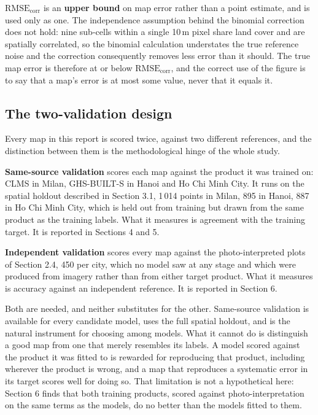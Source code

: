 \documentclass[11pt,a4paper]{article}
\begin{document}
$\mathrm{RMSE}_{\mathrm{corr}}$ is an \textbf{upper bound} on map error rather than a point estimate, and
is used only as one. The independence assumption behind the binomial correction
does not hold: nine sub-cells within a single 10\,m pixel share land cover and
are spatially correlated, so the binomial calculation understates the true
reference noise and the correction consequently removes less error than it
should. The true map error is therefore at or below $\mathrm{RMSE}_{\mathrm{corr}}$, and the correct
use of the figure is to say that a map's error is at most some value, never that
it equals it.

\subsection{The two-validation design}

Every map in this report is scored twice, against two different references, and
the distinction between them is the methodological hinge of the whole study.

\textbf{Same-source validation} scores each map against the product it was trained
on: CLMS in Milan, GHS-BUILT-S in Hanoi and Ho Chi Minh City. It runs on the
spatial holdout described in Section 3.1, 1\,014 points in Milan, 895 in Hanoi,
887 in Ho Chi Minh City, which is held out from training but drawn from the
same product as the training labels. What it measures is agreement with the
training target. It is reported in Sections 4 and 5.

\textbf{Independent validation} scores every map against the photo-interpreted plots
of Section 2.4, 450 per city, which no model saw at any stage and which were
produced from imagery rather than from either target product. What it measures
is accuracy against an independent reference. It is reported in Section 6.

Both are needed, and neither substitutes for the other. Same-source validation
is available for every candidate model, uses the full spatial holdout, and is
the natural instrument for choosing among models. What it cannot do is
distinguish a good map from one that merely resembles its labels. A model scored
against the product it was fitted to is rewarded for reproducing that product,
including wherever the product is wrong, and a map that reproduces a systematic
error in its target scores well for doing so. That limitation is not a
hypothetical here: Section 6 finds that both training products, scored against
photo-interpretation on the same terms as the models, do no better than the
models fitted to them.
\end{document}
